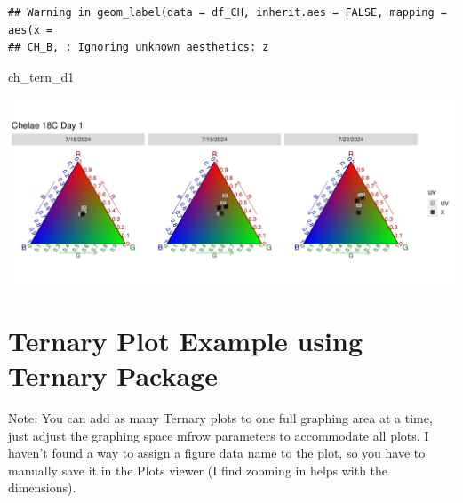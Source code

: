 \documentclass[
]{article}
\newenvironment{Shaded}{\begin{snugshade}}{\end{snugshade}}
\newcommand{\NormalTok}[1]{#1}
\begin{document}
\begin{verbatim}
## Warning in geom_label(data = df_CH, inherit.aes = FALSE, mapping = aes(x =
## CH_B, : Ignoring unknown aesthetics: z
\end{verbatim}

\begin{Shaded}
\begin{Highlighting}[]
\NormalTok{ch\_tern\_d1}
\end{Highlighting}
\end{Shaded}

\includegraphics{color_analysis_pdf_files/figure-latex/ggtern Ternary Plot-1.pdf}

\section{Ternary Plot Example using Ternary
Package}\label{ternary-plot-example-using-ternary-package}

Note: You can add as many Ternary plots to one full graphing area at a
time, just adjust the graphing space mfrow parameters to accommodate all
plots. I haven't found a way to assign a figure data name to the plot,
so you have to manually save it in the Plots viewer (I find zooming in
helps with the dimensions).
\end{document}
